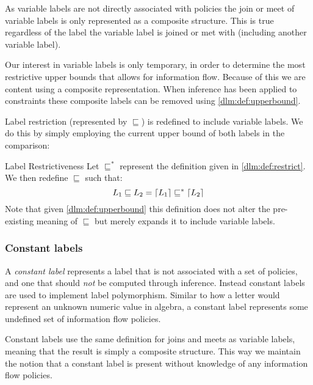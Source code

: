 As variable labels are not directly associated with policies the join or meet of variable labels is only represented as a composite structure.
This is true regardless of the label the variable label is joined or met with (including another variable label).

Our interest in variable labels is only temporary, in order to determine the most restrictive upper bounds that allows for information flow.
Because of this we are content using a composite representation.
When inference has been applied to constraints these composite labels can be removed using \cref{dlm:def:upperbound}.

Label restriction (represented by $\sqsubseteq$) is redefined to include variable labels.
We do this by simply employing the current upper bound of both labels in the comparison:
\begin{definition}{Label Restrictiveness}\label{dlm:def:restrictupperbound}
  Let $\sqsubseteq^*$ represent the definition given in \cref{dlm:def:restrict}.
  We then redefine $\sqsubseteq$ such that:
  \[
    L_1 \sqsubseteq L_2 = \lceil L_1\rceil \sqsubseteq^* \lceil L_2\rceil
  \]
  Note that given \cref{dlm:def:upperbound} this definition does not alter the pre-existing meaning of $\sqsubseteq$ but merely expands it to include variable labels.
\end{definition}

\subsubsection{Constant labels}
A \textit{constant label} represents a label that is not associated with a set of policies, and one that should \textit{not} be computed through inference.
Instead constant labels are used to implement label polymorphism.
Similar to how a letter would represent an unknown numeric value in algebra, a constant label represents some undefined set of information flow policies.

Constant labels use the same definition for joins and meets as variable labels, meaning that the result is simply a composite structure.
This way we maintain the notion that a constant label is present without knowledge of any information flow policies.

